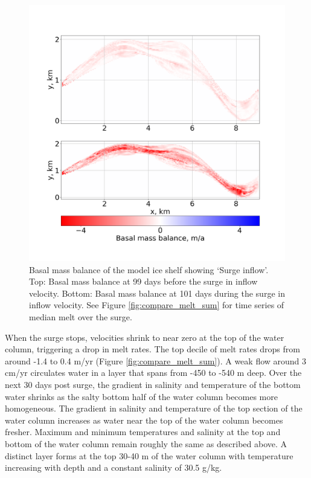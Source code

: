 \begin{figure}[!ht]
\centering
\includegraphics[width=1\textwidth]{chapters/4/surge_melt.png}
\caption[]{Basal mass balance of the model ice shelf showing `Surge inflow'. Top: Basal mass balance at 99 days before the surge in inflow velocity. Bottom: Basal mass balance at 101 days during the surge in inflow velocity. See Figure \ref{fig:compare_melt_sum} for time series of median melt over the surge.}
\label{fig:surge_melt}
\end{figure}

When the surge stops, velocities shrink to near zero at the top of the water column, triggering a drop in melt rates. The top decile of melt rates drops from around -1.4 to 0.4 m/yr (Figure \ref{fig:compare_melt_sum}). A weak flow around 3 cm/yr circulates water in a layer that spans from -450 to -540 m deep. Over the next 30 days post surge, the gradient in salinity and temperature of the bottom water shrinks as the salty bottom half of the water column becomes more homogeneous. The gradient in salinity and temperature of the top section of the water column increases as water near the top of the water column becomes fresher. Maximum and minimum temperatures and salinity at the top and bottom of the water column remain roughly the same as described above. A distinct layer forms at the top 30-40 m of the water column with temperature increasing with depth and a constant salinity of 30.5 g/kg. 


